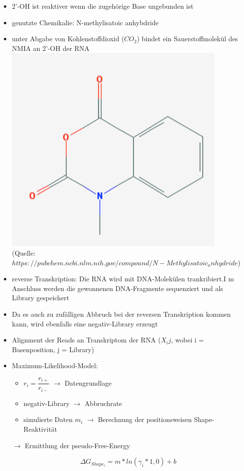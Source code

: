 \begin{itemize}
\item 2'-OH ist reaktiver wenn die zugehörige Base ungebunden ist
\item genutzte Chemikalie: N-methylisatoic anhybdride
\item unter Abgabe von Kohlenstoffdioxid ($CO_2$) bindet ein Sauerstoffmolekül des NMIA an 2'-OH der RNA \\
\includegraphics[scale=0.5]{lectures/160527/pix/NMIA.jpg} \\
(Quelle: $https://pubchem.ncbi.nlm.nih.gov/compound/N-Methylisatoic_anhydride$) \\

\item reverse Transkription: Die RNA wird mit DNA-Molekülen trankribiert.I m Anschluss werden die gewonnenen DNA-Fragmente sequenziert und als Library gespeichert
\item Da es auch zu zufälligen Abbruch bei der reversen Transkription kommen kann, wird ebenfalls eine negativ-Library erzeugt
\item Alignment der Reads an Transkriptom der RNA ($X_ij$, wobei i = Basenposition, j = Library)

\item Maximum-Likelihood-Model:

\begin{itemize}
\item $r_i = \dfrac{r_{i+}}{r_{i-}}$ $\rightarrow$ Datengrundlage
\item negativ-Library $\rightarrow$ Abbruchrate
\item simulierte Daten $m_i$ $\rightarrow$ Berechnung der positionsweisen Shape-Reaktivität 
\end{itemize}

\item[$\rightarrow$] Ermittlung der pseudo-Free-Energy

\begin{equation}
\Delta G_{Shape_i} = m * ln(\gamma_i * 1,0) + b
\end{equation}

\end{itemize}


